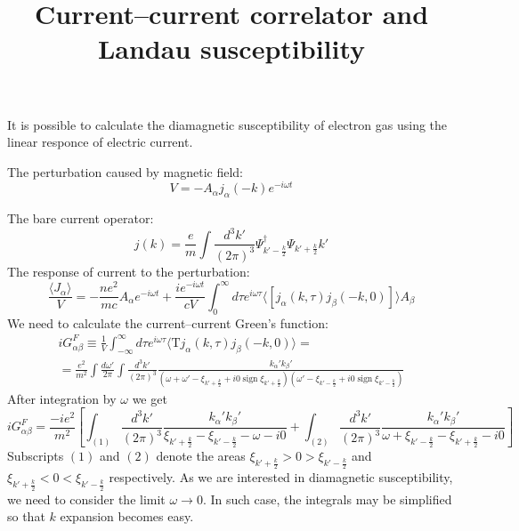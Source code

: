 \documentclass{article}
\title{Current--current correlator and Landau susceptibility}
\newcommand{\average}[1]{\langle #1 \rangle}
\DeclareMathOperator{\sign}{sign}
\begin{document}
\maketitle
It is possible to calculate the diamagnetic susceptibility of electron gas using 
the linear responce of electric current. 

The perturbation caused by magnetic field:
\begin{equation}
    V = -A_\alpha j_\alpha(-k) e^{-i\omega t}
\end{equation}

The bare current operator:
\begin{equation}
    j(k) = \frac{e}{m} \int \frac{d^3 k'}{(2\pi)^3} 
                            \Psi^\dagger_{k'-\frac{k}{2}}
                            \Psi_{k'+\frac{k}{2}} k'
\end{equation}
The response of current to the perturbation:
\begin{equation}
    \frac{\average{J_\alpha}}{V} = -\frac{ne^2}{mc} A_\alpha e^{-i\omega t} +
        \frac{ie^{-i\omega t}}{cV} \int_0^{\infty} d\tau  e^{i\omega \tau}
            \average{[j_\alpha (k, \tau) j_\beta (-k,0)]} A_\beta
\end{equation}
We need to calculate the current--current Green's function:
\begin{multline}
    iG^F_{\alpha \beta} \equiv \frac{1}{V}\int_{-\infty}^{\infty} d\tau  e^{i\omega \tau}
            \average{\mathrm{T}j_\alpha (k, \tau) j_\beta (-k,0)} = \\
    = \frac{e^2}{m^2} \int \frac{d \omega'}{2\pi} 
        \int \frac{d^3 k'}{(2\pi)^3} 
            \frac{k_\alpha' k_\beta'}{(\omega + \omega' - 
                                       \xi_{k'+\frac{k}{2}} + i0\sign{\xi_{k'+\frac{k}{2}}})
                                      (\omega' - 
                                       \xi_{k'-\frac{k}{2}} + i0\sign{\xi_{k'-\frac{k}{2}}})}
\end{multline}
After integration by $\omega$ we get
\begin{equation}
    iG^F_{\alpha \beta} = \frac{-ie^2}{m^2} \left[
        \int_{(1)} \frac{d^3 k'}{(2\pi)^3} \frac{k_\alpha' k_\beta'}
                                {\xi_{k'+\frac{k}{2}} - \xi_{k'-\frac{k}{2}} - \omega - i0} +
        \int_{(2)} \frac{d^3 k'}{(2\pi)^3} \frac{k_\alpha' k_\beta'}
                                {\omega + \xi_{k'-\frac{k}{2}} - \xi_{k'+\frac{k}{2}} - i0} 
                                \right]
\end{equation}
Subscripts $(1)$ and $(2)$ denote the areas 
$\xi_{k'+\frac{k}{2}} > 0 > \xi_{k'-\frac{k}{2}}$ and
$\xi_{k'+\frac{k}{2}} < 0 < \xi_{k'-\frac{k}{2}}$ respectively.
As we are interested in diamagnetic susceptibility, we need to consider the limit
$\omega \to 0$. In such case, the integrals may be simplified so that $k$ expansion 
becomes easy.
\end{document}
